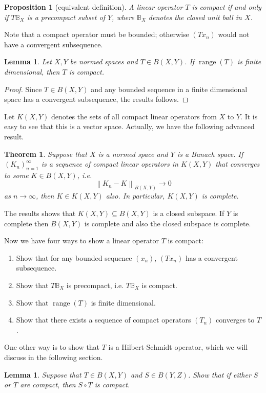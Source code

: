 \documentclass[12pt,a4paper]{report}
\numberwithin{equation}{section}
\theoremstyle{mystyle}
\newtheorem{theorem}[definition]{Theorem}
\newtheorem{lemma}[definition]{Lemma}
\newtheorem{proposition}[definition]{Proposition}
\newcommand{\norm}[1]{\left\lVert #1 \right\rVert}
\newcommand{\range}{\operatorname{range}}
\begin{document}
	\begin{proposition}[equivalent definition]
		A linear operator $T$ is compact if and only if $T\mathbb{B}_X$ is a precompact subset of $Y$, where $\mathbb{B}_X$ denotes the closed unit ball in $X$. 
	\end{proposition}
	
	Note that a compact operator must be bounded; otherwise $(Tx_n)$ would not have a convergent subsequence.
	
	\begin{lemma}
		Let $X,Y$ be normed spaces and $T\in B(X,Y)$. If $\range(T)$ is finite dimensional, then $T$ is compact.
	\end{lemma}
	\begin{proof}
		Since $T\in B(X,Y)$ and any bounded sequence in a finite dimensional space has a convergent subsequence, the results follows.
	\end{proof}

	Let $K(X,Y)$ denotes the sets of all compact linear operators from $X$ to $Y$. It is easy to see that this is a vector space. Actually, we have the following advanced result.
	\begin{theorem}
		Suppose that $X$ is a normed space and $Y$ is a Banach space. If $(K_n)_{n=1}^\infty$ is a sequence of compact linear operators in $K(X,Y)$ that converges to some $K\in B(X,Y)$, i.e.
		$$
		\norm{K_n-K}_{B(X,Y)}\to 0
		$$
		as $n\to \infty$, then $K\in K(X,Y)$ also. In particular, $K(X,Y)$ is complete.
	\end{theorem}
	The results shows that $K(X,Y)\subseteq B(X,Y)$ is a closed subspace. If $Y$ is complete then $B(X,Y)$ is complete and also the closed subspace is complete.
	
	
	Now we have four ways to show a linear operator $T$ is compact:
	\begin{enumerate}
		\item Show that for any bounded sequence $(x_n)$, $(Tx_n)$ has a convergent subsequence.
		\item Show that $T\mathbb{B}_X$ is precompact, i.e. $T\mathbb{B}_X$ is compact.
		\item Show that $\range(T)$ is finite dimensional.
		\item Show that there exists a sequence of compact operators $(T_n)$ converges to $T$.
	\end{enumerate}
	One other way is to show that $T$ is a Hilbert-Schmidt operator, which we will discuss in the following section.
	
	\begin{lemma}
		Suppose that $T\in B(X,Y)$ and $S\in B(Y,Z)$. Show that if either $S$ or $T$ are compact, then $S\circ T$ is compact. \label{lem:composition of compact}
	\end{lemma}
	
\end{document}
